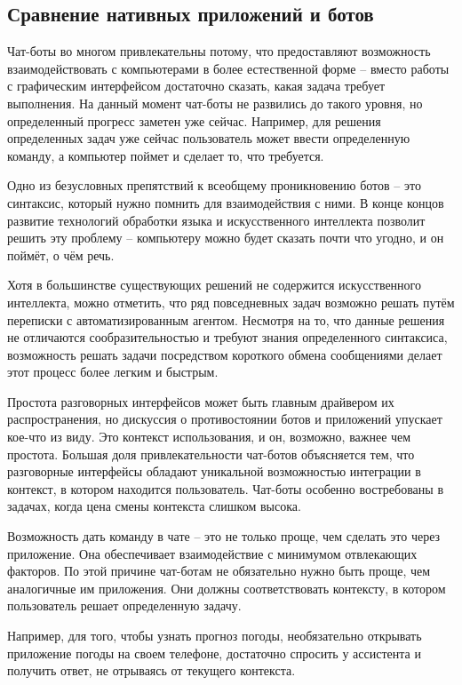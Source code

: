\subsection{Сравнение нативных приложений и ботов} 
\label{sec:analysis:botsvsnative}

Чат-боты во многом привлекательны потому, что предоставляют возможность взаимодействовать с компьютерами в более естественной форме -- вместо работы с графическим интерфейсом достаточно сказать, какая задача требует выполнения. На данный момент чат-боты не развились до такого уровня, но определенный прогресс заметен уже сейчас. Например, для решения определенных задач уже сейчас пользователь может ввести определенную команду, а компьютер поймет и сделает то, что требуется.

Одно из безусловных препятствий к всеобщему проникновению ботов -- это синтаксис, который нужно помнить для взаимодействия с ними. В конце концов развитие технологий обработки языка и искусственного интеллекта позволит решить эту проблему -- компьютеру можно будет сказать почти что угодно, и он поймёт, о чём речь.

Хотя в большинстве существующих решений не содержится искусственного интеллекта, можно отметить, что ряд повседневных задач возможно решать путём переписки с автоматизированным агентом. Несмотря на то, что данные решения не отличаются сообразительностью и требуют знания определенного синтаксиса, возможность решать задачи посредством короткого обмена сообщениями делает этот процесс более легким и быстрым.

Простота разговорных интерфейсов может быть главным драйвером их распространения, но дискуссия о противостоянии ботов и приложений упускает кое-что из виду. Это контекст использования, и он, возможно, важнее чем простота. Большая доля привлекательности чат-ботов объясняется тем, что разговорные интерфейсы обладают уникальной возможностью интеграции в контекст, в котором находится пользователь. Чат-боты особенно востребованы в задачах, когда цена смены контекста слишком высока.

Возможность дать команду в чате -- это не только проще, чем сделать это через приложение. Она обеспечивает взаимодействие с минимумом отвлекающих факторов. По этой причине чат-ботам не обязательно нужно быть проще, чем аналогичные им приложения. Они должны соответствовать контексту, в котором пользователь решает определенную задачу.

Например, для того, чтобы узнать прогноз погоды, необязательно открывать приложение погоды на своем телефоне, достаточно спросить у ассистента и получить ответ, не отрываясь от текущего контекста.

